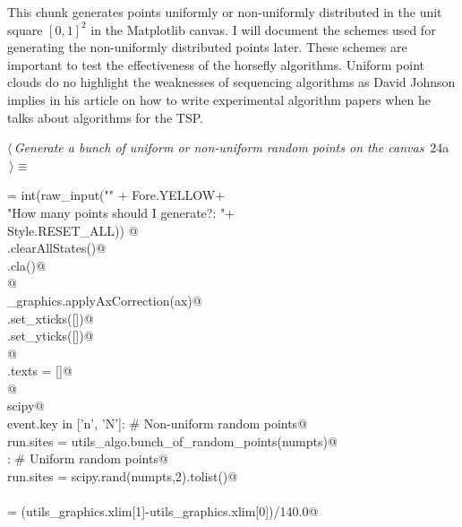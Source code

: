 \documentclass[11.5pt]{report}
\begin{document}
\vspace{-0.8cm}\newchunk This chunk generates points uniformly or non-uniformly distributed in the 
unit square $[0,1]^2$ in the Matplotlib canvas. I will document the schemes used for 
generating the non-uniformly distributed points later. These schemes are important to test the effectiveness of 
the horsefly algorithms. Uniform point clouds do no highlight the weaknesses of 
sequencing algorithms as David Johnson implies in his article on how to write 
experimental algorithm papers when he talks about algorithms for the TSP. 

\begin{flushleft} \small\label{scrap18}\raggedright\small
{} $\langle\,${\itshape Generate a bunch of uniform or non-uniform random points on the canvas}\nobreak\ {\footnotesize {24a}}$\,\rangle\equiv$
\vspace{-1ex}
\begin{list}{}{} \item
\mbox{}\verb@numpts = int(raw_input("\n" + Fore.YELLOW+\@\\
\mbox{}\verb@                       "How many points should I generate?: "+\@\\
\mbox{}\verb@                       Style.RESET_ALL)) @\\
\mbox{}\verb@run.clearAllStates()@\\
\mbox{}\verb@ax.cla()@\\
\mbox{}\verb@               @\\
\mbox{}\verb@utils_graphics.applyAxCorrection(ax)@\\
\mbox{}\verb@ax.set_xticks([])@\\
\mbox{}\verb@ax.set_yticks([])@\\
\mbox{}\verb@                @\\
\mbox{}\verb@fig.texts = []@\\
\mbox{}\verb@                 @\\
\mbox{}\verb@import scipy@\\
\mbox{}\verb@if event.key in ['n', 'N']: # Non-uniform random points@\\
\mbox{}\verb@        run.sites = utils_algo.bunch_of_random_points(numpts)@\\
\mbox{}\verb@else : # Uniform random points@\\
\mbox{}\verb@        run.sites = scipy.rand(numpts,2).tolist()@\\
\mbox{}\verb@@\\
\mbox{}\verb@patchSize  = (utils_graphics.xlim[1]-utils_graphics.xlim[0])/140.0@\\

\end{list}
\end{flushleft}
\end{document}
